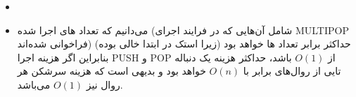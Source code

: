 \begin{itemize}
\item
\begin{LTR}
\begin{algorithm}
\end{algorithm}
\end{LTR}
\item می‌دانیم که تعداد های اجرا شده (شامل آن‌هایی که در فرایند اجرای MULTIPOP فراخوانی شده‌اند)
حداکثر برابر تعداد ها خواهد بود (زیرا استک در ابتدا خالی بوده) بنابراین
اگر هزینه اجرا PUSH و POP از $O(1)$ باشد، حداکثر هزینه یک دنباله
تایی از روال‌های  برابر با $O(n)$ خواهد بود و
بدیهی است که هزینه سرشکن هر روال نیز $O(1)$ می‌باشد.
\end{itemize}
